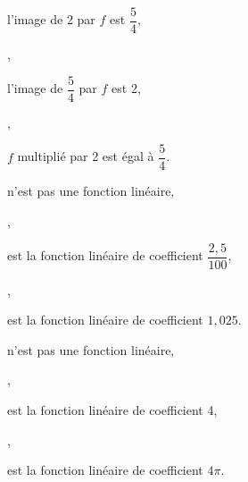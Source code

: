 \ifdefined\COMPLETE
\else
    
    
\fi

\thispagestyle{empty}
\vspace*{-2mm}
\begin{alterqcm}[lq=10cm]

 

  {%
   {\begin{minipage}[t]{6cm} l'image de 2 par $f$ est $\dfrac{5}{4}$, \end{minipage}},
   {\begin{minipage}[t]{6cm} l'image de $\dfrac{5}{4}$ par $f$ est 2,\end{minipage}},
   {\begin{minipage}[t]{6cm} $f$ multiplié par 2 est égal à $\dfrac{5}{4}$.
    \end{minipage}}
 }

  {%
   {\begin{minipage}[t]{7cm} n'est pas une fonction linéaire, \end{minipage}},
   {\begin{minipage}[t]{7cm} est la fonction linéaire de coefficient $\dfrac{2,5}{100}$,\end{minipage}},
   {\begin{minipage}[t]{7cm} est la fonction linéaire de coefficient $1,025$.
    \end{minipage}}
 }

  {%
   {\begin{minipage}[t]{7cm} n'est pas une fonction linéaire, \end{minipage}},
   {\begin{minipage}[t]{7cm} est la fonction linéaire de coefficient 4,\end{minipage}},
   {\begin{minipage}[t]{7cm} est la fonction linéaire de coefficient $4\pi$.
    \end{minipage}}
 }


\end{alterqcm}
